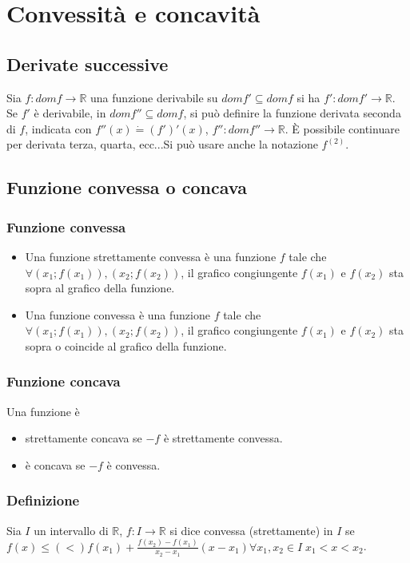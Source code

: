 \chapter{Convessit\`a e concavit\`a}
\section{Derivate successive}
Sia $f:domf\rightarrow\mathbb{R}$ una funzione derivabile su $domf'\subseteq domf$ si ha $f':domf'\rightarrow\mathbb{R}$. Se $f'$ \`e derivabile, in $domf''\subseteq domf$, si 
pu\`o definire la funzione derivata seconda di $f$, indicata con $f''(x)\dot{=}(f')'(x)$, $f'':domf''\rightarrow\mathbb{R}$. \`E possibile continuare per derivata terza, quarta, 
ecc...Si pu\`o usare anche la notazione $f^{(2)}$.
\section{Funzione convessa o concava}
\subsection{Funzione convessa}
\begin{itemize}
\item Una funzione strettamente convessa \`e una funzione $f$ tale che $\forall (x_1;f(x_1)),(x_2;f(x_2))$, il grafico congiungente $f(x_1)\text{ e }f(x_2)$ sta sopra al grafico della funzione.
\item Una funzione convessa \`e una funzione $f$ tale che $\forall (x_1;f(x_1)),(x_2;f(x_2))$, il grafico congiungente $f(x_1)\text{ e }f(x_2)$ sta sopra o coincide al grafico della funzione.
\end{itemize}
\subsection{Funzione concava}
Una funzione \`e 
\begin{itemize}
\item strettamente concava se $-f$ \`e strettamente convessa.
\item \`e concava se $-f$ \`e convessa.
\end{itemize}
\subsection{Definizione}
Sia $I$ un intervallo di $\mathbb{R}$, $f:I\rightarrow\mathbb{R}$ si dice convessa (strettamente) in $I$ se $f(x)\le(<) f(x_1)+\frac{f(x_2)-f(x_1)}{x_2-x_1}(x-x_1)\forall x_1,x_2\in 
I\;x_1<x<x_2$.
